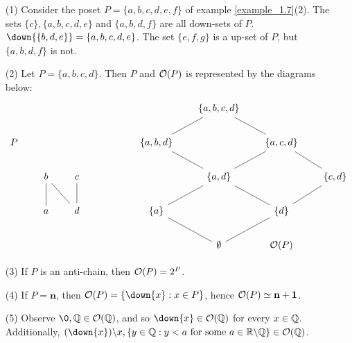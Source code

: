 \begin{example}\label{example_1.13}
  \begin{enumerate}
    \item[(1)] Consider the poset $P=\{a,b,c,d,e,f\}$ of example
      \ref{example_1.7}(2). The sets $\{c\},\{a,b,c,d,e\}$ and
      $\{a,b,d,f\}$ are all down-sets of $P$.
      $\down{\{b,d,e\}}=\{a,b,c,d,e\}$. The set $\{e,f,g\}$ is a
      up-set of $P$, but $\{a,b,d,f\}$ is not.

    \item[(2)] Let $P=\{a,b,c,d\}$. Then $P$ and  $\mathcal{O}(P)$ is
      represented by the diagrams below:
      \[\begin{tikzcd}[column sep=scriptsize]
        &&&&&& {\{a, b, c, d\}} \\
        P &&&&& {\{a,b,d\}} && {\{a,c,d\}} \\
        & b & c &&&& {\{a,d\}} && {\{c,d\}} \\
        & a & d &&& {\{a\}} && {\{d\}} \\
        &&&&&& \emptyset & {\Oc(P)}
        \arrow[no head, from=2-6, to=1-7]
        \arrow[no head, from=2-8, to=1-7]
        \arrow[no head, from=3-7, to=2-6]
        \arrow[no head, from=3-7, to=2-8]
        \arrow[no head, from=3-9, to=2-8]
        \arrow[no head, from=4-2, to=3-2]
        \arrow[no head, from=4-3, to=3-2]
        \arrow[no head, from=4-3, to=3-3]
        \arrow[no head, from=4-6, to=3-7]
        \arrow[no head, from=4-8, to=3-7]
        \arrow[no head, from=4-8, to=3-9]
        \arrow[no head, from=5-7, to=4-6]
        \arrow[no head, from=5-7, to=4-8]
      \end{tikzcd}\]

    \item[(3)] If $P$ is an anti-chain, then $\mathcal{O}(P)=2^P$.

    \item[(4)] If $P=\mathbf{n}$, then $\Oc(P)=\{\down{x} : x \in
      P\}$, hence $\mathcal{O}(P) \simeq \mathbf{n+1}$.

    \item[(5)] Observe $\0, \Q \in \Oc(\Q)$, and so $\down{x} \in
      \Oc(\Q)$ for every $x \in \mathbb{Q}$. Additionally,
      $\com{(\down{x})}{x}, \{y \in \Q : y<a \text{ for some } a \in
      \com{\R}{\Q}\} \in \Oc(\Q)$.
  \end{enumerate}
\end{example}

